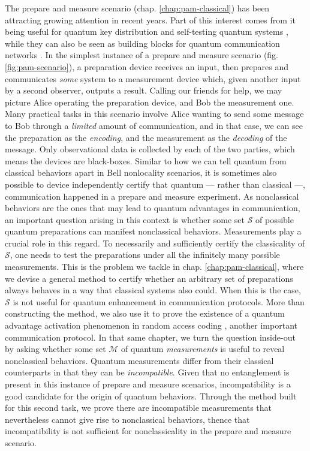 The prepare and measure scenario (chap. \ref{chap:pam-classical}) has been attracting growing attention in recent years. Part of this interest comes from it being useful for quantum key distribution \cite{pawlowski_pamqkd_2011} and self-testing quantum systems \cite{tavakoli_selftesting_2018,tavakoli_selftesting_2020}, while they can also be seen as building blocks for quantum communication networks \cite{poderini_pamcriteria_2020,bowles_pamnetworks_2015}. In the simplest instance of a prepare and measure scenario (fig. \ref{fig:pam-scenario}), a preparation device receives an input, then prepares and communicates \emph{some} system to a measurement device which, given another input by a second observer, outputs a result. Calling our friends for help, we may picture Alice operating the preparation device, and Bob the measurement one. Many practical tasks in this scenario involve Alice wanting to send some message to Bob through a \emph{limited} amount of communication, and in that case, we can see the preparation as the \emph{encoding}, and the measurement as the \emph{decoding} of the message. Only observational data is collected by each of the two parties, which means the devices are black-boxes. Similar to how we can tell quantum from classical behaviors apart in Bell nonlocality scenarios, it is sometimes also possible to device independently certify that quantum --- rather than classical ---, communication happened in a prepare and measure experiment. As nonclassical behaviors are the ones that may lead to quantum advantages in communication, an important question arising in this context is whether some set $\mathcal{S}$ of possible quantum preparations can manifest nonclassical behaviors. Measurements play a crucial role in this regard. To necessarily and sufficiently certify the classicality of $\mathcal{S}$, one needs to test the preparations under all the infinitely many possible measurements. This is the problem we tackle in chap. \ref{chap:pam-classical}, where we devise a general method to certify whether an arbitrary set of preparations always behaves in a way that classical systems also could. When this is the case, $\mathcal{S}$ is not useful for quantum enhancement in communication protocols. More than constructing the method, we also use it to prove the existence of a quantum advantage activation phenomenon in random access coding \cite{ambainis_qracsoriginal_1999}, another important communication protocol. In that same chapter, we turn the question inside-out by asking whether some set $\mathcal{M}$ of quantum \emph{measurements} is useful to reveal nonclassical behaviors. Quantum measurements differ from their classical counterparts in that they can be \emph{incompatible}. Given that no entanglement is present in this instance of prepare and measure scenarios, incompatibility is a good candidate for the origin of quantum behaviors. Through the method built for this second task, we prove there are incompatible measurements that nevertheless cannot give rise to nonclassical behaviors, thence that incompatibility is not sufficient for nonclassicality in the prepare and measure scenario. %